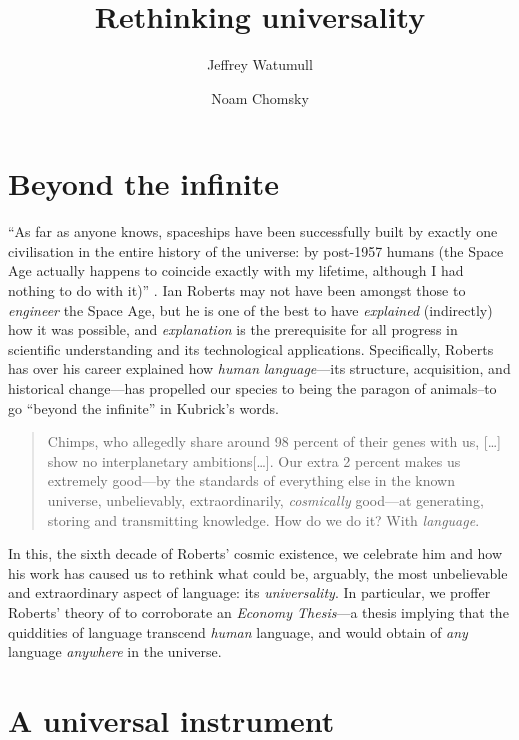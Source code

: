 \documentclass[output=paper]{langsci/langscibook}
\author{Jeffrey Watumull\affiliation{Oceanit}\and Noam
    Chomsky\affiliation{University of Arizona, Massachusetts Institute of
Technology}}
\title{Rethinking universality}
\begin{document}
\glsresetall

\section{Beyond the infinite}%

“As far as anyone knows, spaceships have been successfully built by exactly one
civilisation in the entire history of the universe: by post-1957 humans (the
Space Age actually happens to coincide exactly with my lifetime, although I had
nothing to do with it)” \citep[1]{Roberts2017}. Ian Roberts may not have been
amongst those to \emph{engineer} the Space Age, but he is one of the best to
have \emph{explained} (indirectly) how it was possible, and \emph{explanation}
is the prerequisite for all progress in scientific understanding and its
technological applications. Specifically, Roberts has over his career explained
how \emph{human} \emph{language}—its structure, acquisition, and historical
change—has propelled our species to being the paragon of animals--to go
\enquote{beyond the infinite} in Kubrick's words. \blockquote{Chimps, who
    allegedly share around 98 percent of their genes with us, […] show no
    interplanetary ambitions[…]. Our extra 2 percent makes us extremely good—by
    the standards of everything else in the known universe, unbelievably,
    extraordinarily, \emph{cosmically} good—at generating, storing and
    transmitting knowledge. How do we do it? With \emph{language}.
\citep[1--2]{Roberts2017}} In this, the sixth decade of Roberts’ cosmic
existence, we celebrate him and how his work has caused us to rethink what
could be, arguably, the most unbelievable and extraordinary aspect of language:
its \emph{universality}. In particular, we proffer Roberts’ theory of
 to corroborate an \emph{Economy Thesis}—a thesis
    implying that the quiddities of language transcend \emph{human} language,
    and would obtain of \emph{any} language \emph{anywhere} in the universe.

\section{A universal instrument}
\end{document}
